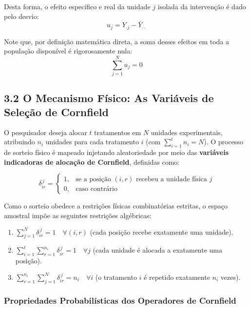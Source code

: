 \documentclass[
]{article}
\providecommand{\tightlist}{%
  \setlength{\itemsep}{0pt}\setlength{\parskip}{0pt}}
\begin{document}
Desta forma, o efeito específico e real da unidade \(j\) isolada da
intervenção é dado pelo desvio:
\[u_j = Y_{\cdot j} - \bar Y_{\cdot\cdot}\]

Note que, por definição matemática direta, a soma desses efeitos em toda
a população disponível é rigorosamente nula: \[\sum_{j=1}^{N} u_j = 0\]

\subsection{3.2 O Mecanismo Físico: As Variáveis de Seleção de
Cornfield}\label{o-mecanismo-fuxedsico-as-variuxe1veis-de-seleuxe7uxe3o-de-cornfield}

O pesquisador deseja alocar \(t\) tratamentos em \(N\) unidades
experimentais, atribuindo \(n_i\) unidades para cada tratamento \(i\)
(com \(\sum_{i=1}^{t} n_i = N\)). O processo de sorteio físico é mapeado
injetando aleatoriedade por meio das \textbf{variáveis indicadoras de
alocação de Cornfield}, definidas como:

\[\delta_{ir}^{\,j} = \begin{cases}
1, & \text{se a posição } (i,r) \text{ recebeu a unidade física } j \\
0, & \text{caso contrário}
\end{cases}\]

Como o sorteio obedece a restrições físicas combinatórias estritas, o
espaço amostral impõe as seguintes restrições algébricas:

\begin{enumerate}
\def\labelenumi{\arabic{enumi}.}
\tightlist
\item
  \(\sum_{j=1}^{N} \delta_{ir}^{\,j} = 1 \quad \forall (i,r)\) (cada
  posição recebe exatamente uma unidade).
\item
  \(\sum_{i=1}^{t} \sum_{r=1}^{n_i} \delta_{ir}^{\,j} = 1 \quad \forall j\)
  (cada unidade é alocada a exatamente uma posição).
\item
  \(\sum_{r=1}^{n_i} \sum_{j=1}^{N} \delta_{ir}^{\,j} = n_i \quad \forall i\)
  (o tratamento \(i\) é repetido exatamente \(n_i\) vezes).
\end{enumerate}

\subsubsection{Propriedades Probabilísticas dos Operadores de
Cornfield}\label{propriedades-probabiluxedsticas-dos-operadores-de-cornfield}
\end{document}
